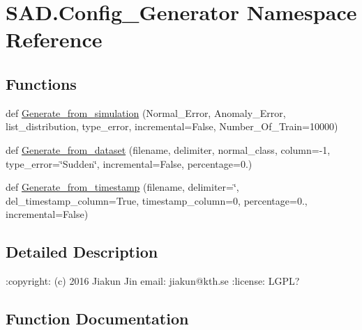 \hypertarget{namespaceSAD_1_1Config__Generator}{}\section{S\+A\+D.\+Config\+\_\+\+Generator Namespace Reference}
\label{namespaceSAD_1_1Config__Generator}
\subsection*{Functions}
\begin{DoxyCompactItemize}
\item 
def \hyperlink{namespaceSAD_1_1Config__Generator_ae141063b2f05ef30572b428d0ce17a54}{Generate\+\_\+from\+\_\+simulation} (Normal\+\_\+\+Error, Anomaly\+\_\+\+Error, list\+\_\+distribution, type\+\_\+error, incremental=False, Number\+\_\+\+Of\+\_\+\+Train=10000)
\item 
def \hyperlink{namespaceSAD_1_1Config__Generator_a7a4f97db8a198075e635bac49c744e3e}{Generate\+\_\+from\+\_\+dataset} (filename, delimiter, normal\+\_\+class, column=-\/1, type\+\_\+error=\char`\"{}Sudden\char`\"{}, incremental=False, percentage=0.)
\item 
def \hyperlink{namespaceSAD_1_1Config__Generator_a115ab2861e50a264cb48a51cbfde5340}{Generate\+\_\+from\+\_\+timestamp} (filename, delimiter=\char`\"{},  del\+\_\+timestamp\+\_\+column=True,  timestamp\+\_\+column=0,  percentage=0.,  incremental=False)
\end{DoxyCompactItemize}


\subsection{Detailed Description}
\begin{DoxyVerb}:copyright: (c) 2016 Jiakun Jin
email: jiakun@kth.se
:license: LGPL?
\end{DoxyVerb}
 

\subsection{Function Documentation}
